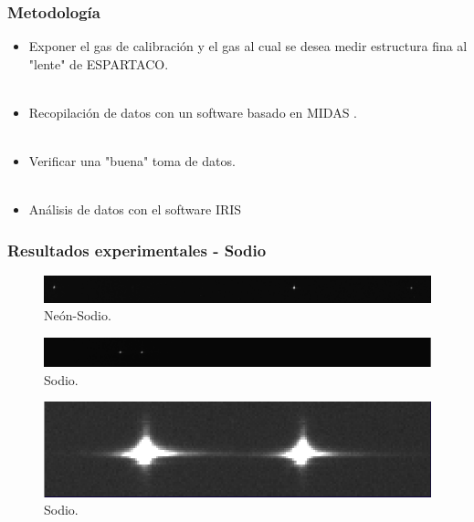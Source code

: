 \documentclass{beamer}
\begin{document}
\begin{frame}[fragile] %
\frametitle{Metodología}
%
\begin{itemize}
	\item Exponer el gas de calibración y el gas al cual se desea medir estructura fina al "lente" de ESPARTACO.
	\
	\\
	
	\
	\\
	
	\item Recopilación de datos con un software basado en MIDAS \cite{midas}.
	\
	\\
	
	\
	\\
	
	\item Verificar una "buena" toma de datos.
	\
	\\
	
	\
	\\
	
	\item Análisis de datos con el software IRIS \cite{iris}
\end{itemize}

\end{frame}

\begin{frame}[fragile]
\frametitle{Resultados experimentales - Sodio}
\begin{figure}[h!]
	\centering
	\includegraphics[width=1.\textwidth,height = 0.1\textheight]{neon-sodio}
	\caption{Neón-Sodio.}
\end{figure}

\begin{figure}[h!]
	\centering
	\includegraphics[width=1.\textwidth,height = 0.1\textheight]{co-sodio}
	\caption{Sodio.}
\end{figure}

\begin{figure}[h!]
	\centering
	\includegraphics[width=1.\textwidth,height = 0.15\textheight]{sodio}
	\caption{Sodio.}
\end{figure}


\end{frame}
\end{document}
